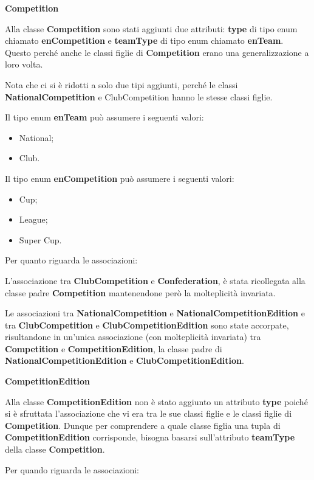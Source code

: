 \newpage
\textbf{Competition}
\bigskip

Alla classe \textbf{Competition} sono stati aggiunti due 
attributi: \textbf{type} di tipo enum chiamato 
\textbf{enCompetition} e \textbf{teamType} di tipo enum 
chiamato \textbf{enTeam}. Questo perché anche le classi 
figlie di \textbf{Competition} erano una generalizzazione a 
loro volta.

Nota che ci si è ridotti a solo due tipi aggiunti, perché le 
classi \textbf{NationalCompetition} e {ClubCompetition} hanno 
le stesse classi figlie.

Il tipo enum \textbf{enTeam} può assumere i seguenti valori:
\begin{itemize}
	\item National;
	\item Club.
\end{itemize}

Il tipo enum \textbf{enCompetition} può assumere i seguenti 
valori:
\begin{itemize}
	\item Cup;
	\item League;
	\item Super Cup.
\end{itemize}

Per quanto riguarda le associazioni:

L'associazione tra \textbf{ClubCompetition} e 
\textbf{Confederation}, è stata ricollegata alla classe padre 
\textbf{Competition} mantenendone però la molteplicità 
invariata.


Le associazioni tra \textbf{NationalCompetition} e  
\textbf{NationalCompetitionEdition} e tra 
\textbf{ClubCompetition} e \textbf{ClubCompetitionEdition} 
sono state accorpate, risultandone in un'unica associazione 
(con molteplicità invariata) tra \textbf{Competition} e 
\textbf{CompetitionEdition}, la classe padre di 
\textbf{NationalCompetitionEdition} e 
\textbf{ClubCompetitionEdition}.

\bigskip
\textbf{CompetitionEdition}
\bigskip

Alla classe \textbf{CompetitionEdition} non è stato aggiunto 
un attributo \textbf{type} poiché si è sfruttata 
l'associazione che vi era tra le sue classi figlie e le 
classi figlie di \textbf{Competition}. Dunque per comprendere 
a quale classe figlia una tupla di 
\textbf{CompetitionEdition} corrisponde, bisogna basarsi 
sull'attributo \textbf{teamType} della classe 
\textbf{Competition}.

Per quando riguarda le associazioni:

